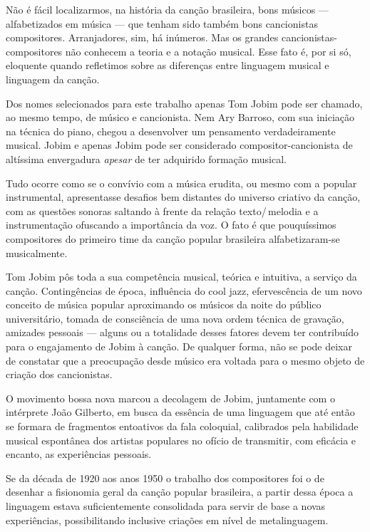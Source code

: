 Não é fácil localizarmos, na história da canção brasileira, bons músicos
--- alfabetizados em música --- que tenham sido também bons cancionistas
compositores. Arranjadores, sim, há inúmeros. Mas os grandes
cancionistas-compositores não conhecem a teoria e a notação musical.
Esse fato é, por si só, eloquente quando refletimos sobre as diferenças
entre linguagem musical e linguagem da canção.

Dos nomes selecionados para este trabalho apenas Tom Jobim pode ser
chamado, ao mesmo tempo, de músico e cancionista. Nem Ary Barroso, com
sua iniciação na técnica do piano, chegou a desenvolver um pensamento
verdadeiramente musical. Jobim e apenas Jobim pode ser considerado
compositor-cancionista de altíssima envergadura \textit{apesar} de ter
adquirido formação musical.

Tudo ocorre como se o convívio com a música erudita, ou mesmo com a
popular instrumental, apresentasse desafios bem distantes do universo
criativo da canção, com as questões sonoras saltando à frente da relação
texto/\,melodia e a instrumentação ofuscando a importância da voz. O fato
é que pouquíssimos compositores do primeiro time da canção popular
brasileira alfabetizaram-se musicalmente.

Tom Jobim pôs toda a sua competência musical, teórica e intuitiva, a
serviço da canção. Contingências de época, influência do cool jazz,
efervescência de um novo conceito de música popular aproximando os
músicos da noite do público universitário, tomada de consciência de uma
nova ordem técnica de gravação, amizades pessoais --- alguns ou a
totalidade desses fatores devem ter contribuído para o engajamento de
Jobim à canção. De qualquer forma, não se pode deixar de constatar que a
preocupação desde músico era voltada para o mesmo objeto de criação dos
cancionistas.

O movimento bossa nova marcou a decolagem de Jobim, juntamente com o
intérprete João Gilberto, em busca da essência de uma linguagem que até
então se formara de fragmentos entoativos da fala coloquial, calibrados
pela habilidade musical espontânea dos artistas populares no ofício de
transmitir, com eficácia e encanto, as experiências pessoais.

Se da década de 1920 aos anos 1950 o trabalho dos compositores foi o de
desenhar a fisionomia geral da canção popular brasileira, a partir dessa
época a linguagem estava suficientemente consolidada para servir de base
a novas experiências, possibilitando inclusive criações em nível de
metalinguagem.

